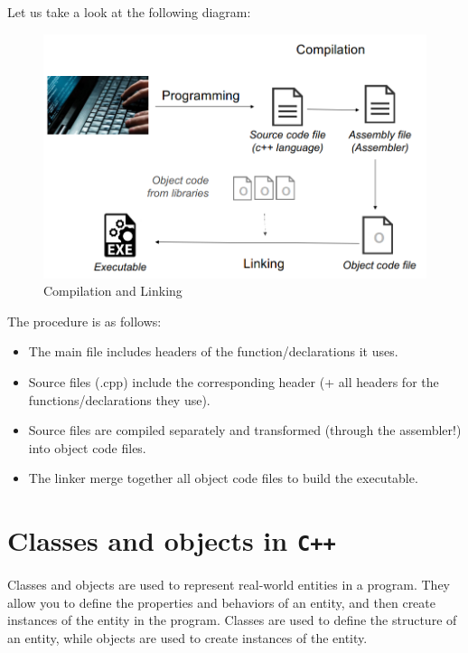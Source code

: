 Let us take a look at the following diagram:

\begin{figure}[ht]
    \centering
    \includegraphics[scale=0.7]{figures/image1.png}
    \caption{Compilation and Linking}
    \label{fig:compilation_and_linking}
\end{figure}

The procedure is as follows:

\begin{itemize}
    \item The main file includes headers of the function/declarations it uses.
    \item Source files (.cpp) include the corresponding header (+ all headers for the functions/declarations they use).
    \item Source files are compiled separately and transformed (through the assembler!) into object code files.
    \item The linker merge together all object code files to build the executable.
\end{itemize}

\section{Classes and objects in \texttt{C++}}

Classes and objects are used to represent real-world entities in a program. They allow you to define the properties and
behaviors of an entity, and then create instances of the entity in the program. Classes are used to define the structure
of an entity, while objects are used to create instances of the entity.\\

